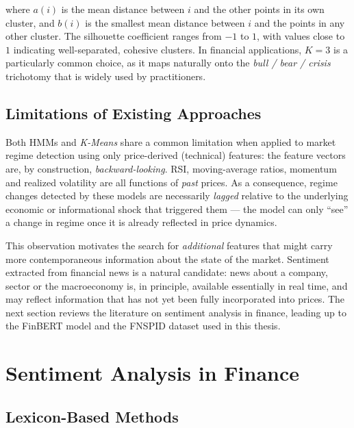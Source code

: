 where $a(i)$ is the mean distance between $i$ and the other points in its
own cluster, and $b(i)$ is the smallest mean distance between $i$ and the
points in any other cluster. The silhouette coefficient ranges from $-1$
to $1$, with values close to $1$ indicating well-separated, cohesive
clusters. In financial applications, $K=3$ is a particularly common
choice, as it maps naturally onto the \emph{bull / bear / crisis}
trichotomy that is widely used by practitioners.

\subsection{Limitations of Existing Approaches}
\label{sec:soa-limitations}

Both HMMs and \textit{K-Means} share a common limitation when applied to
market regime detection using only price-derived (technical) features:
the feature vectors are, by construction, \emph{backward-looking}. RSI,
moving-average ratios, momentum and realized volatility are all functions
of \emph{past} prices. As a consequence, regime changes detected by these
models are necessarily \emph{lagged} relative to the underlying economic
or informational shock that triggered them --- the model can only
``see'' a change in regime once it is already reflected in price
dynamics.

This observation motivates the search for \emph{additional} features
that might carry more contemporaneous information about the state of the
market. Sentiment extracted from financial news is a natural candidate:
news about a company, sector or the macroeconomy is, in principle,
available essentially in real time, and may reflect information that has
not yet been fully incorporated into prices. The next section reviews the
literature on sentiment analysis in finance, leading up to the
FinBERT model and the FNSPID dataset used in this thesis.

\section{Sentiment Analysis in Finance}
\label{sec:soa-sentiment}

\subsection{Lexicon-Based Methods}
\label{sec:soa-lexicon}

